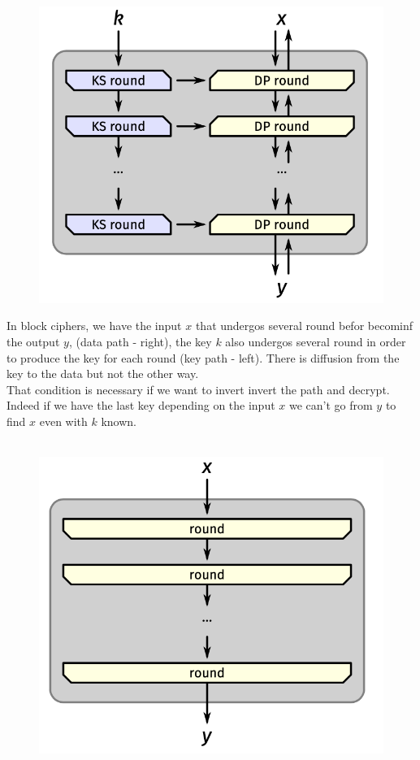 \documentclass[11pt,a4paper]{report}
\begin{document}
\begin{figure}
\vspace{-8mm}
\includegraphics[scale=0.4]{img/img12.png}
\end{figure}
In block ciphers, we have the input $x$ that undergos several round befor becominf the output $y$, (data path - right), the key $k$ also undergos several round in order to produce the key for each round (key path - left).
There is diffusion from the key to the data but not the other way.\\ 
That condition is necessary if we want to invert invert the path and decrypt. Indeed if we have the last key depending on the input $x$ we can't go from $y$ to find $x$ even with $k$ known.\\
\\

\begin{figure}
\vspace{-8mm}
\includegraphics[scale=0.4]{img/img13.png}
\end{figure}
\end{document}
